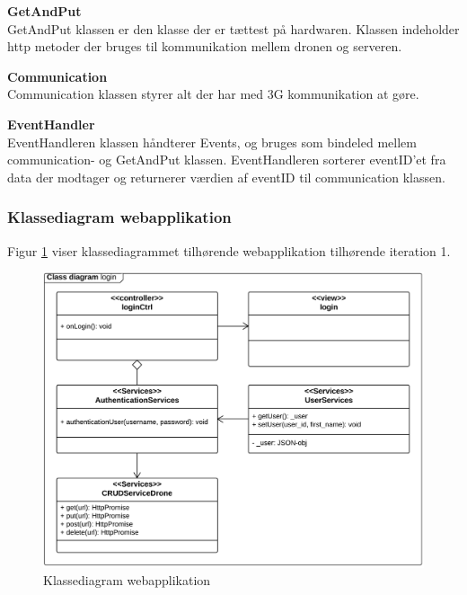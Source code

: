 \textbf{GetAndPut} \\
GetAndPut klassen er den klasse der er tættest på hardwaren. Klassen indeholder http metoder der bruges til kommunikation mellem dronen og serveren. 

\textbf{Communication} \\
Communication klassen styrer alt der har med 3G kommunikation at gøre.

\textbf{EventHandler} \\
EventHandleren klassen håndterer Events, og bruges som bindeled mellem communication- og GetAndPut klassen. EventHandleren sorterer eventID'et fra data der modtager og returnerer værdien af eventID til communication klassen. 


\newpage

\subsubsection*{Klassediagram webapplikation}
\vspace{-0.3cm}
Figur \ref{fig:classDiagram_webapplikation} viser klassediagrammet tilhørende webapplikation tilhørende iteration 1.

\vspace{-0.2cm}
\begin{figure}[H]
	\centering
	\includegraphics[width=1\textwidth]{Billeder/klasse_diagrammer/login_class_diagram.png}
	\vspace{-0.6cm}
	\caption{Klassediagram webapplikation}
	\label{fig:classDiagram_webapplikation}
\end{figure}

